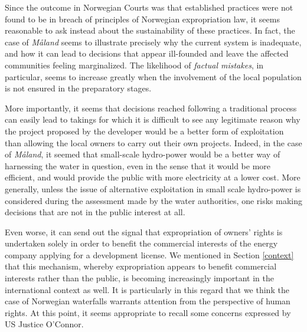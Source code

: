Since the outcome in Norwegian Courts was that established practices were not found to be in breach of principles of Norwegian expropriation law, it seems reasonable to ask instead about the sustainability of these practices. In fact, the case of \emph{Måland} seems to illustrate precisely why the current system is inadequate, and how it can lead to decisions that appear ill-founded and leave the affected communities feeling marginalized. The likelihood of \emph{factual mistakes}, in particular, seems to increase greatly when the involvement of the local population is not ensured in the preparatory stages.

More importantly, it seems that decisions reached following a traditional process can easily lead to takings for which it is difficult to see any legitimate reason why the project proposed by the developer would be a better form of exploitation than allowing the local owners to carry out their own projects. Indeed, in the case of \emph{Måland}, it seemed that small-scale hydro-power would be a better way of harnessing the water in question, even in the sense that it would be more efficient, and would provide the public with more electricity at a lower cost. More generally, unless the issue of alternative exploitation in small scale hydro-power is considered during the assessment made by the water authorities, one risks making decisions that are not in the public interest at all. 

Even worse, it can send out the signal that expropriation of owners' rights is undertaken solely in order to benefit the commercial interests of the energy company applying for a development license. We mentioned in Section \ref{context} that this mechanism, whereby expropriation appears to benefit commercial interests rather than the public, is becoming increasingly important in the international context as well. It is particularly in this regard that we think the case of Norwegian waterfalls warrants attention from the perspective of human rights. At this point, it seems appropriate to recall some concerns expressed by US Justice O'Connor.

